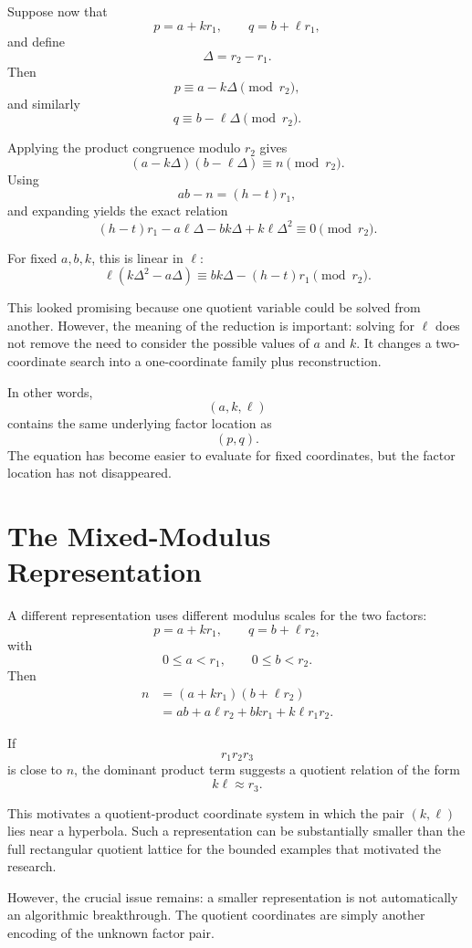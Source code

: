 \documentclass[11pt,a4paper]{article}
\begin{document}
Suppose now that
\[
    p=a+kr_1,
    \qquad
    q=b+\ell r_1,
\]
and define
\[
    \Delta=r_2-r_1.
\]
Then
\[
    p\equiv a-k\Delta\pmod{r_2},
\]
and similarly
\[
    q\equiv b-\ell\Delta\pmod{r_2}.
\]

Applying the product congruence modulo $r_2$ gives
\[
    (a-k\Delta)(b-\ell\Delta)\equiv n\pmod{r_2}.
\]
Using
\[
    ab-n=(h-t)r_1,
\]
and expanding yields the exact relation
\[
    (h-t)r_1-a\ell\Delta-bk\Delta+k\ell\Delta^2
    \equiv 0\pmod{r_2}.
\]

For fixed $a,b,k$, this is linear in $\ell$:
\[
    \ell(k\Delta^2-a\Delta)
    \equiv
    bk\Delta-(h-t)r_1
    \pmod{r_2}.
\]

This looked promising because one quotient variable could be solved from another. However, the meaning of the reduction is important: solving for $\ell$ does not remove the need to consider the possible values of $a$ and $k$. It changes a two-coordinate search into a one-coordinate family plus reconstruction.

In other words,
\[
    (a,k,\ell)
\]
contains the same underlying factor location as
\[
    (p,q).
\]
The equation has become easier to evaluate for fixed coordinates, but the factor location has not disappeared.

\section{The Mixed-Modulus Representation}

A different representation uses different modulus scales for the two factors:
\[
    p=a+kr_1,
    \qquad
    q=b+\ell r_2,
\]
with
\[
    0\leq a<r_1,
    \qquad
    0\leq b<r_2.
\]
Then
\begin{align}
    n
    &= (a+kr_1)(b+\ell r_2)\\
    &=ab+a\ell r_2+bk r_1+k\ell r_1r_2.
\end{align}

If
\[
    r_1r_2r_3
\]
is close to $n$, the dominant product term suggests a quotient relation of the form
\[
    k\ell\approx r_3.
\]

This motivates a quotient-product coordinate system in which the pair $(k,\ell)$ lies near a hyperbola. Such a representation can be substantially smaller than the full rectangular quotient lattice for the bounded examples that motivated the research.

However, the crucial issue remains: a smaller representation is not automatically an algorithmic breakthrough. The quotient coordinates are simply another encoding of the unknown factor pair.
\end{document}
